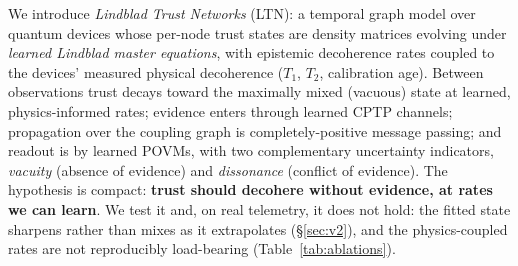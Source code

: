 \documentclass[journal]{IEEEtran}
\begin{document}
We introduce \emph{Lindblad Trust Networks} (LTN): a temporal graph model over
quantum devices whose per-node trust states are density matrices evolving under
\emph{learned Lindblad master equations}, with epistemic decoherence rates coupled
to the devices' measured physical decoherence ($T_1$, $T_2$, calibration age).
Between observations trust decays toward the maximally mixed (vacuous) state at
learned, physics-informed rates; evidence enters through learned CPTP channels;
propagation over the coupling graph is completely-positive message passing; and
readout is by learned POVMs, with two complementary uncertainty indicators,
\emph{vacuity} (absence of evidence) and \emph{dissonance} (conflict of evidence).
The hypothesis is
compact: \textbf{trust should decohere without evidence, at rates we can learn}. We
test it and, on real telemetry, it does not hold: the fitted state sharpens rather
than mixes as it extrapolates (\S\ref{sec:v2}), and the physics-coupled rates are not
reproducibly load-bearing (Table~\ref{tab:ablations}).
\end{document}
